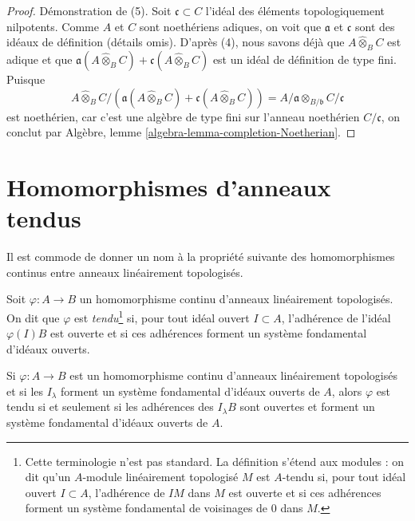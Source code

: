 \begin{proof}
\medskip\noindent
Démonstration de (5).
Soit $\mathfrak c \subset C$ l'idéal des éléments topologiquement nilpotents.
Comme $A$ et $C$ sont noethériens adiques, on voit que
$\mathfrak a$ et $\mathfrak c$ sont des idéaux de définition (détails omis).
D'après (4), nous savons déjà que
$A \widehat{\otimes}_B C$ est adique et que
$\mathfrak a(A \widehat{\otimes}_B C) + \mathfrak c(A \widehat{\otimes}_B C)$
est un idéal de définition de type fini. Puisque
$$
A \widehat{\otimes}_B C /
\left(\mathfrak a(A \widehat{\otimes}_B C) +
\mathfrak c(A \widehat{\otimes}_B C)\right)
=
A/\mathfrak a \otimes_{B/\mathfrak b} C/\mathfrak c
$$
est noethérien, car c'est une algèbre de type fini sur l'anneau noethérien
$C/\mathfrak c$, on conclut par
Algèbre, lemme \ref{algebra-lemma-completion-Noetherian}.
\end{proof}









\section{Homomorphismes d'anneaux tendus}
\label{section-taut-ring-maps}

\noindent
Il est commode de donner un nom à la propriété suivante
des homomorphismes continus entre anneaux linéairement topologisés.

\begin{definition}
\label{definition-taut}
Soit $\varphi : A \to B$ un homomorphisme continu d'anneaux linéairement topologisés.
On dit que $\varphi$ est {\it tendu}\footnote{Cette terminologie n'est pas standard.
La définition s'étend aux modules : on dit qu'un
$A$-module linéairement topologisé $M$ est $A$-tendu si, pour tout idéal ouvert $I \subset A$, l'adhérence
de $IM$ dans $M$ est ouverte et si ces adhérences forment un système fondamental de
voisinages de $0$ dans $M$.}
si, pour tout idéal ouvert $I \subset A$, l'adhérence de l'idéal $\varphi(I)B$
est ouverte et si ces adhérences forment un système fondamental d'idéaux ouverts.
\end{definition}

\noindent
Si $\varphi : A \to B$ est un homomorphisme continu d'anneaux linéairement topologisés
et si les $I_\lambda$ forment un système fondamental d'idéaux ouverts de $A$, alors $\varphi$
est tendu si et seulement si
les adhérences des $I_\lambda B$ sont ouvertes et forment un système fondamental
d'idéaux ouverts de $A$.

